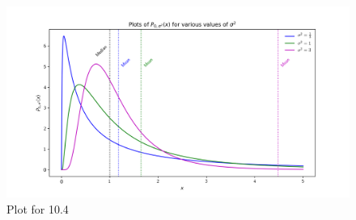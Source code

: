 \documentclass[a4paper,twoside]{article}
\begin{document}
\begin{itemize}
\begin{problem}
        \end{problem}
        \begin{figure}[h]
            \centering
            \includegraphics[width=\textwidth]{Problem_10_Plots.png}
            \caption{Plot for 10.4}
            \label{fig:plots_10_4}
        \end{figure}
\end{itemize}
\end{document}
